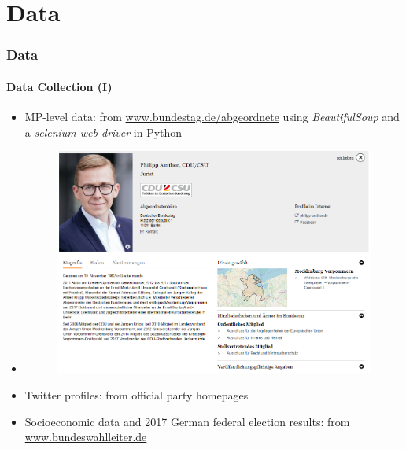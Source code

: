 \documentclass[xcolor=dvipsnames]{beamer}
\begin{document}
\section{Data}
\begin{frame}
\frametitle{Data}
\framesubtitle{Data Collection (I)}
\begin{itemize}
\item MP-level data: from \url{www.bundestag.de/abgeordnete} using \textit{BeautifulSoup} \parencite{richardson2007beautiful} and a \textit{selenium web driver} in Python \parencite{van1995python} 
\item[] 
	\begin{figure}[h!]
  	\centering
  	\includegraphics[scale = 0.25]{../plots/presentation/amthor.png}
	\end{figure}
\item Twitter profiles: from official party homepages
\item Socioeconomic data and 2017 German federal election results: from \url{www.bundeswahlleiter.de}
\end{itemize}
\end{frame}
\end{document}
